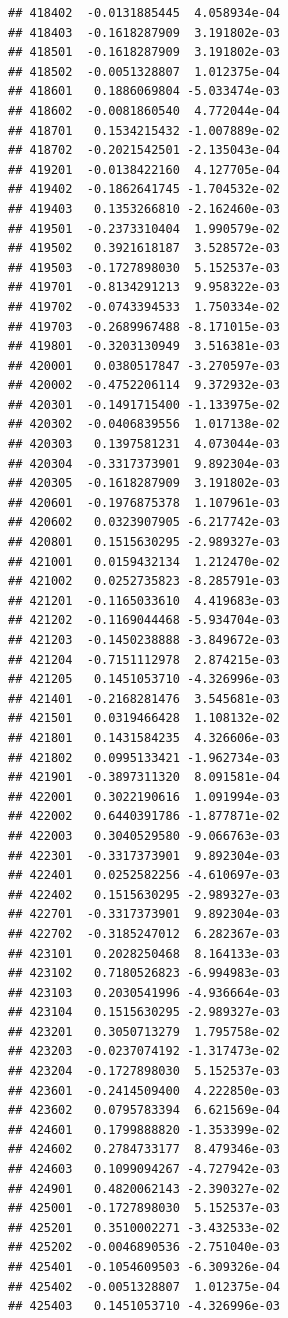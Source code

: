 \documentclass[ignorenonframetext,]{beamer}
\begin{document}
\begin{frame}[fragile]
\begin{verbatim}
## 418402  -0.0131885445  4.058934e-04
## 418403  -0.1618287909  3.191802e-03
## 418501  -0.1618287909  3.191802e-03
## 418502  -0.0051328807  1.012375e-04
## 418601   0.1886069804 -5.033474e-03
## 418602  -0.0081860540  4.772044e-04
## 418701   0.1534215432 -1.007889e-02
## 418702  -0.2021542501 -2.135043e-04
## 419201  -0.0138422160  4.127705e-04
## 419402  -0.1862641745 -1.704532e-02
## 419403   0.1353266810 -2.162460e-03
## 419501  -0.2373310404  1.990579e-02
## 419502   0.3921618187  3.528572e-03
## 419503  -0.1727898030  5.152537e-03
## 419701  -0.8134291213  9.958322e-03
## 419702  -0.0743394533  1.750334e-02
## 419703  -0.2689967488 -8.171015e-03
## 419801  -0.3203130949  3.516381e-03
## 420001   0.0380517847 -3.270597e-03
## 420002  -0.4752206114  9.372932e-03
## 420301  -0.1491715400 -1.133975e-02
## 420302  -0.0406839556  1.017138e-02
## 420303   0.1397581231  4.073044e-03
## 420304  -0.3317373901  9.892304e-03
## 420305  -0.1618287909  3.191802e-03
## 420601  -0.1976875378  1.107961e-03
## 420602   0.0323907905 -6.217742e-03
## 420801   0.1515630295 -2.989327e-03
## 421001   0.0159432134  1.212470e-02
## 421002   0.0252735823 -8.285791e-03
## 421201  -0.1165033610  4.419683e-03
## 421202  -0.1169044468 -5.934704e-03
## 421203  -0.1450238888 -3.849672e-03
## 421204  -0.7151112978  2.874215e-03
## 421205   0.1451053710 -4.326996e-03
## 421401  -0.2168281476  3.545681e-03
## 421501   0.0319466428  1.108132e-02
## 421801   0.1431584235  4.326606e-03
## 421802   0.0995133421 -1.962734e-03
## 421901  -0.3897311320  8.091581e-04
## 422001   0.3022190616  1.091994e-03
## 422002   0.6440391786 -1.877871e-02
## 422003   0.3040529580 -9.066763e-03
## 422301  -0.3317373901  9.892304e-03
## 422401   0.0252582256 -4.610697e-03
## 422402   0.1515630295 -2.989327e-03
## 422701  -0.3317373901  9.892304e-03
## 422702  -0.3185247012  6.282367e-03
## 423101   0.2028250468  8.164133e-03
## 423102   0.7180526823 -6.994983e-03
## 423103   0.2030541996 -4.936664e-03
## 423104   0.1515630295 -2.989327e-03
## 423201   0.3050713279  1.795758e-02
## 423203  -0.0237074192 -1.317473e-02
## 423204  -0.1727898030  5.152537e-03
## 423601  -0.2414509400  4.222850e-03
## 423602   0.0795783394  6.621569e-04
## 424601   0.1799888820 -1.353399e-02
## 424602   0.2784733177  8.479346e-03
## 424603   0.1099094267 -4.727942e-03
## 424901   0.4820062143 -2.390327e-02
## 425001  -0.1727898030  5.152537e-03
## 425201   0.3510002271 -3.432533e-02
## 425202  -0.0046890536 -2.751040e-03
## 425401  -0.1054609503 -6.309326e-04
## 425402  -0.0051328807  1.012375e-04
## 425403   0.1451053710 -4.326996e-03

\end{verbatim}
\end{frame}
\end{document}
